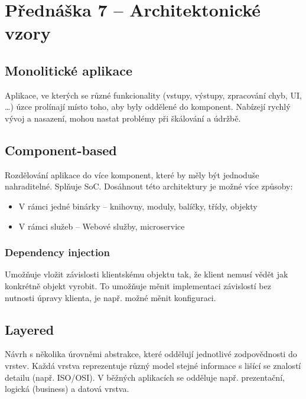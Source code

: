 \section{Přednáška 7 -- Architektonické vzory}

\subsection{Monolitické aplikace}

Aplikace, ve kterých se různé funkcionality (vstupy, výstupy, zpracování chyb, UI, \dots) úzce prolínají místo toho, aby byly oddělené do komponent.
Nabízejí rychlý vývoj a nasazení, mohou nastat problémy při škálování a údržbě.

\subsection{Component-based}

Rozdělování aplikace do více komponent, které by měly být jednoduše nahraditelné.
Splňuje SoC.
Dosáhnout této architektury je možné více způsoby:

\begin{itemize}
    \item V rámci jedné binárky -- knihovny, moduly, balíčky, třídy, objekty
    \item V rámci služeb -- Webové služby, microservice
\end{itemize}

\subsubsection{Dependency injection}

Umožňuje vložit závislosti klientskému objektu tak, že klient nemusí vědět jak konkrétně objekt vyrobit.
To umožňuje měnit implementaci závislostí bez nutnosti úpravy klienta, je např. možné měnit konfiguraci.

\subsection{Layered}

Návrh s několika úrovněmi abstrakce, které oddělují jednotlivé zodpovědnosti do vrstev.
Každá vrstva reprezentuje různý model stejné informace s lišící se znalostí detailu (např. ISO/OSI).
V běžných aplikacích se odděluje např. prezentační, logická (business) a datová vrstva.

